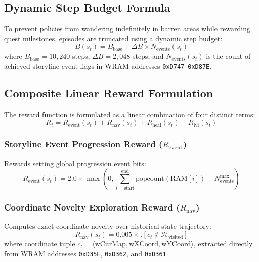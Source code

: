 \documentclass[conference]{IEEEtran}
\begin{document}
\subsection{Dynamic Step Budget Formula}
To prevent policies from wandering indefinitely in barren areas while rewarding quest milestones, episodes are truncated using a dynamic step budget:
\begin{equation}
B(s_t) = B_{\text{base}} + \Delta B \times N_{\text{events}}(s_t)
\end{equation}
where $B_{\text{base}} = 10{,}240$ steps, $\Delta B = 2{,}048$ steps, and $N_{\text{events}}(s_t)$ is the count of achieved storyline event flags in WRAM addresses \texttt{0xD747}--\texttt{0xD87E}.

\subsection{Composite Linear Reward Formulation}
The reward function is formulated as a linear combination of four distinct terms:
\begin{equation}
R_t = R_{\text{event}}(s_t) + R_{\text{nav}}(s_t) + R_{\text{heal}}(s_t) + R_{\text{lvl}}(s_t)
\end{equation}

\subsubsection{Storyline Event Progression Reward \texorpdfstring{($R_{\text{event}}$)}{(R\_event)}}
Rewards setting global progression event bits:
\begin{equation}
R_{\text{event}}(s_t) = 2.0 \times \max\left(0, \sum_{i=\text{start}}^{\text{end}} \text{popcount}(\text{RAM}[i]) - N_{\text{events}}^{\max}\right)
\end{equation}

\subsubsection{Coordinate Novelty Exploration Reward \texorpdfstring{($R_{\text{nav}}$)}{(R\_nav)}}
Computes exact coordinate novelty over historical state trajectory:
\begin{equation}
R_{\text{nav}}(s_t) = 0.005 \times \mathbb{I}[c_t \notin \mathcal{H}_{\text{visited}}]
\end{equation}
where coordinate tuple $c_t = \langle \text{wCurMap}, \text{wXCoord}, \text{wYCoord} \rangle$, extracted directly from WRAM addresses \texttt{0xD35E}, \texttt{0xD362}, and \texttt{0xD361}.
\end{document}

